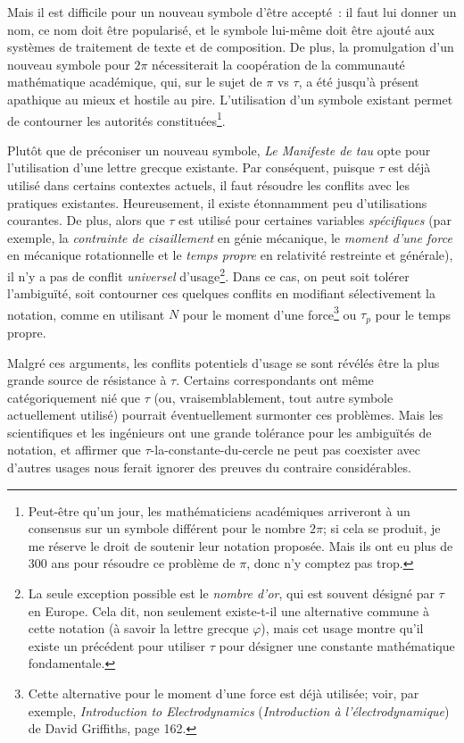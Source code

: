 Mais il est difficile pour un nouveau symbole d'être accepté~: il faut lui
donner un nom, ce nom doit être popularisé, et le symbole lui-même doit être
ajouté aux systèmes de traitement de texte et de composition. De plus, la
promulgation d'un nouveau symbole pour $2\pi$ nécessiterait la coopération de la
communauté mathématique académique, qui, sur le sujet de $\pi$ vs $\tau$, a été
jusqu'à présent apathique au mieux et hostile au pire. L'utilisation d'un
symbole existant permet de contourner les autorités
constituées\ns\footnote{Peut-être qu'un jour, les mathématiciens académiques
arriveront à un consensus sur un symbole différent pour le nombre $2\pi$\ns; si
cela se produit, je me réserve le droit de soutenir leur notation proposée. Mais
ils ont eu plus de 300 ans pour résoudre ce problème de $\pi$, donc n'y comptez
pas trop.}.

Plutôt que de préconiser un nouveau symbole, \emph{Le Manifeste de tau} opte
pour l'utilisation d'une lettre grecque existante. Par conséquent, puisque
$\tau$ est déjà utilisé dans certains contextes actuels, il faut résoudre les
conflits avec les pratiques existantes. Heureusement, il existe étonnamment peu
d'utilisations courantes. De plus, alors que $\tau$ est utilisé pour certaines
variables \emph{spécifiques} (par exemple, la \emph{contrainte de cisaillement}
en génie mécanique, le \emph{moment d'une force} en mécanique rotationnelle et
le \emph{temps propre} en relativité restreinte et générale), il n'y a pas
de conflit \emph{universel} d'usage\ns\footnote{La seule exception
possible est le \emph{nombre d'or}, qui est souvent désigné par $\tau$ en
Europe. Cela dit, non seulement existe-t-il une alternative commune à cette notation
(à savoir la lettre grecque $\varphi$), mais cet usage montre qu'il existe
un précédent pour utiliser $\tau$ pour désigner une constante mathématique
fondamentale.}. Dans ce cas, on peut soit tolérer l'ambiguïté, soit contourner
ces quelques conflits en modifiant sélectivement la notation, comme en
utilisant $N$ pour le moment d'une force\ns\footnote{Cette alternative pour le
moment d'une force est déjà utilisée\ns; voir, par exemple, \emph{Introduction to
Electrodynamics} (\emph{Introduction à l'électrodynamique}) de David Griffiths,
page 162.} ou $\tau_p$ pour le temps propre.

Malgré ces arguments, les conflits potentiels d'usage se sont révélés être
la plus grande source de résistance à $\tau$. Certains correspondants ont même
catégoriquement nié que $\tau$ (ou, vraisemblablement, tout autre symbole
actuellement utilisé) pourrait éventuellement surmonter ces problèmes. Mais les
scientifiques et les ingénieurs ont une grande tolérance pour les ambiguïtés de
notation, et affirmer que $\tau$-la-constante-du-cercle ne peut pas coexister
avec d'autres usages nous ferait ignorer des preuves du contraire considérables.

